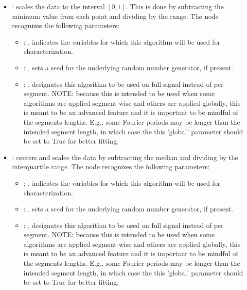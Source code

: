 \begin{itemize}
    \item {}:
      scales the data to the interval $[0, 1]$. This is done by subtracting the
      minimum value from each point and dividing by the range.
      The  node recognizes the following parameters:
        \begin{itemize}
          \item {}: , 
            indicates the variables for which this algorithm will be used for characterization.
          \item {}: , 
            sets a seed for the underlying random number generator, if present.
          \item {}: , 
            designates this algorithm to be used on full signal instead of per
            segment. NOTE: because this is intended to be used when some algorithms are
            applied segment-wise and others are applied globally, this is meant to be an
            advanced feature and it is important to be mindful of the segments lengths.
            E.g., some Fourier periods may be longer than the intended segment length, in
            which case the this 'global' parameter should be set to True for better
            fitting. 
      \end{itemize}

    \item {}:
      centers and scales the data by subtracting the median and dividing by     the interquartile
      range.
      The  node recognizes the following parameters:
        \begin{itemize}
          \item {}: , 
            indicates the variables for which this algorithm will be used for characterization.
          \item {}: , 
            sets a seed for the underlying random number generator, if present.
          \item {}: , 
            designates this algorithm to be used on full signal instead of per
            segment. NOTE: because this is intended to be used when some algorithms are
            applied segment-wise and others are applied globally, this is meant to be an
            advanced feature and it is important to be mindful of the segments lengths.
            E.g., some Fourier periods may be longer than the intended segment length, in
            which case the this 'global' parameter should be set to True for better
            fitting. 
      \end{itemize}


\end{itemize}

